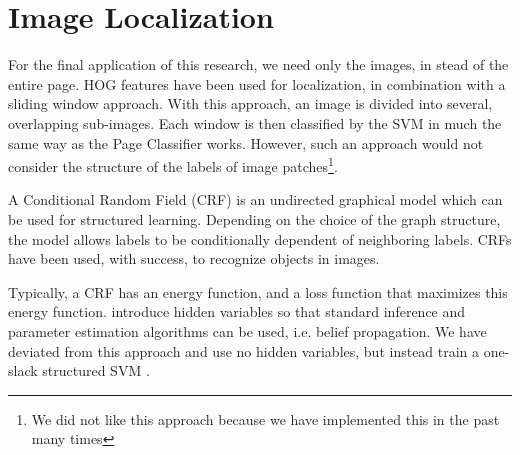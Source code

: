 \section{Image Localization}
\label{sec:imageloc}

For the final application of this research, we need only the images, in stead of
the entire page. HOG features have been used for localization, in combination
with a sliding window approach\cite{harzallah2009combining,
suard2006pedestrian}. With this approach, an image is divided into several,
overlapping sub-images. Each window is then classified by
the SVM in much the same way as the Page Classifier works. However, such an approach
would not consider the structure of the labels of image
patches\footnote{We did not like this approach because we have implemented this
in the past many times}.

A Conditional Random Field (CRF) \cite{lafferty2001conditional} is an undirected
graphical model which can be used for structured learning. Depending on the
choice of the graph structure, the model allows labels to be conditionally
dependent of neighboring labels. CRFs have been used, with success, to recognize
objects in images\cite{quattoni2004conditional}.

Typically, a CRF has an energy function, and a loss function that maximizes this
energy function. \cite{quattoni2004conditional} introduce hidden variables so
that standard inference and parameter estimation algorithms can be used, i.e.
belief propagation. We have deviated from this approach and use no hidden
variables, but instead train a one-slack structured SVM \cite{joachims2009cutting}.



